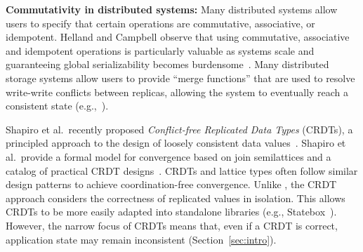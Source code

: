 \vspace{0.5em}\noindent
\textbf{Commutativity in distributed systems:} Many distributed systems allow
users to specify that certain operations are commutative, associative, or
idempotent. Helland and Campbell observe that using commutative, associative and
idempotent operations is particularly valuable as systems scale and guaranteeing
global serializability becomes burdensome~\cite{Helland2009}. Many
distributed storage systems allow users to provide ``merge functions'' that are
used to resolve write-write conflicts between replicas, allowing the system to
eventually reach a consistent state
(e.g.,~\cite{DeCandia2007,statebox,Lloyd2011,Reiher1994,Terry1995}).%



Shapiro et al.\ recently proposed \emph{Conflict-free Replicated Data Types}
(CRDTs), a principled approach to the design of loosely consistent data
values~\cite{Shapiro2011b}. Shapiro et al.\ provide a formal model for
convergence based on join semilattices and a catalog of practical CRDT
designs~\cite{Shapiro2011a}. CRDTs and \lang lattice types often follow similar
design patterns to achieve coordination-free convergence. Unlike \lang, the CRDT
approach considers the correctness of replicated values in isolation. This
allows CRDTs to be more easily adapted into standalone libraries (e.g.,
Statebox~\cite{statebox}). However, the narrow focus of CRDTs means that, even
if a CRDT is correct, application state may remain inconsistent
(Section~\ref{sec:intro}).

